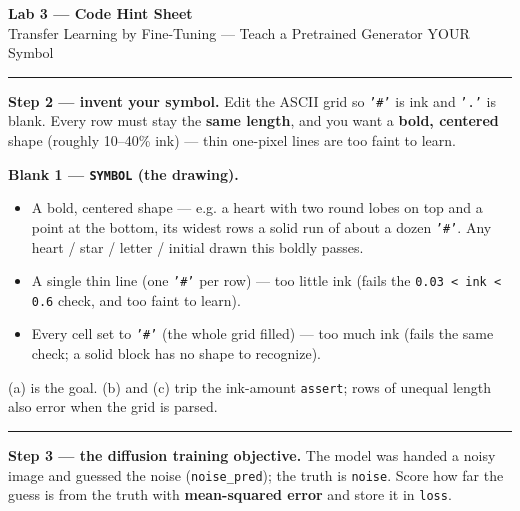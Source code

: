 \documentclass[11pt]{article}
\newcommand{\opt}[1]{\texttt{#1}}
\begin{document}
\small

\begin{center}
{\Large \textbf{Lab 3 --- Code Hint Sheet}}\\[2pt]
{\normalsize Transfer Learning by Fine-Tuning --- Teach a Pretrained Generator YOUR Symbol}
\end{center}

\vspace{-2pt}
\begin{center}
\end{center}

\vspace{2pt}\hrule\vspace{4pt}

\textbf{Step 2 --- invent your symbol.}\; {\small Edit the ASCII grid so \texttt{'\#'} is ink and
\texttt{'.'} is blank. Every row must stay the \textbf{same length}, and you want a \textbf{bold,
centered} shape (roughly 10--40\% ink) --- thin one-pixel lines are too faint to learn.}

\textbf{Blank 1 --- \texttt{SYMBOL} (the drawing).}
\begin{itemize}
  \item[(a)] A bold, centered shape --- e.g. a heart with two round lobes on top and a point at the
    bottom, its widest rows a solid run of about a dozen \opt{'\#'}. Any heart / star / letter /
    initial drawn this boldly passes.
  \item[(b)] A single thin line (one \opt{'\#'} per row) --- too little ink (fails the
    \opt{0.03 < ink < 0.6} check, and too faint to learn).
  \item[(c)] Every cell set to \opt{'\#'} (the whole grid filled) --- too much ink (fails the same
    check; a solid block has no shape to recognize).
\end{itemize}
{\small (a) is the goal. (b) and (c) trip the ink-amount \texttt{assert}; rows of unequal length
also error when the grid is parsed.}

\vspace{3pt}\hrule\vspace{4pt}

\textbf{Step 3 --- the diffusion training objective.}\; {\small The model was handed a noisy image
and guessed the noise (\texttt{noise\_pred}); the truth is \texttt{noise}. Score how far the guess
is from the truth with \textbf{mean-squared error} and store it in \texttt{loss}.}
\end{document}
